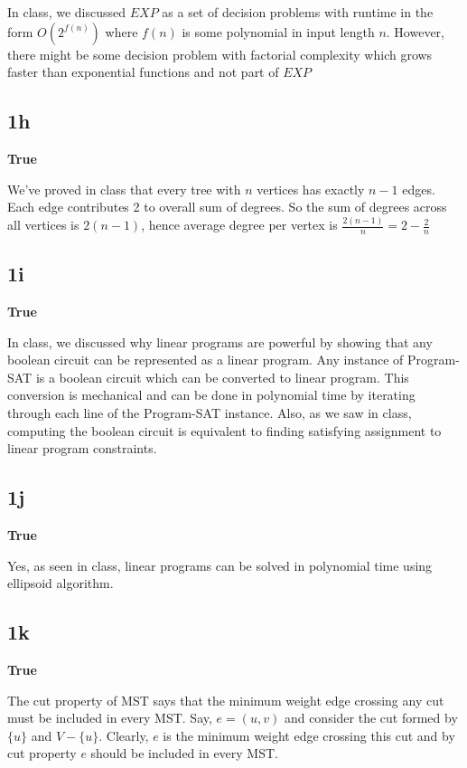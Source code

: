 \documentclass{article}
\begin{document}
    In class, we discussed $EXP$ as a set of decision problems with runtime in the form $O(2^{f(n)})$ where $f(n)$ is some polynomial in input length $n$. However, there might be some decision problem with factorial complexity which grows faster than exponential functions and not part of $EXP$

    \subsection*{1h}
    \textbf{True}

    We've proved in class that every tree with $n$ vertices has exactly $n-1$ edges. Each edge contributes 2 to overall sum of degrees. So the sum of degrees across all vertices is $2(n-1)$, hence average degree per vertex is $\frac{2(n-1)}{n} = 2 - \frac{2}{n}$

    \subsection*{1i}
    \textbf{True}

    In class, we discussed why linear programs are powerful by showing that any boolean circuit can be represented as a linear program. Any instance of Program-SAT is a boolean circuit which can be converted to linear program. This conversion is mechanical and can be done in polynomial time by iterating through each line of the Program-SAT instance. Also, as we saw in class, computing the boolean circuit is equivalent to finding satisfying assignment to linear program constraints.

    \subsection*{1j}
    \textbf{True}

    Yes, as seen in class, linear programs can be solved in polynomial time using ellipsoid algorithm.

    \subsection*{1k}
    \textbf{True}

    The cut property of MST says that the minimum weight edge crossing any cut must be included in every MST. Say, $e = (u, v)$ and consider the cut formed by $\{u\}$ and $V - \{u\}$. Clearly, $e$ is the minimum weight edge crossing this cut and by cut property $e$ should be included in every MST.
\end{document}
